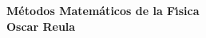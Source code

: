 \phantom{X}%
\vspace*{4cm}
\begin{center}
 \textbf{\huge M\'etodos Matem\'aticos  de la F\'{\i}sica} \\
\vspace{1cm}
 \textbf{\Large \sc Oscar Reula}
\end{center}
\vfill
\vspace*{5cm}
\phantom{Y}
\vfill


